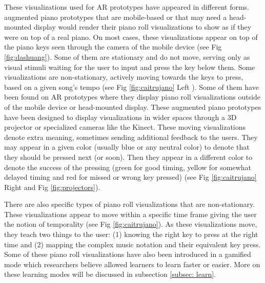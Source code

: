 \documentclass[sigconf, screen, review]{acmart}
\let\xtodo\todo
\renewcommand{\todo}[1]{\xtodo[inline]{#1}}
\newcommand{\todoj}[1]{\xtodo[inline,color=orange!50]{Jordan: #1}}
\begin{document}
These visualizations used for AR prototypes have appeared in different forms. augmented piano prototypes that are mobile-based or that may need a head-mounted display would render their piano roll visualizations to show as if they were on top of a real piano. On most cases, these visualizations appear on top of the piano keys seen through the camera of the mobile device (see Fig \ref{fig:dashuang}). Some of them are stationary and do not move, serving only as visual stimuli waiting for the user to input and press the key below them. Some visualizations are non-stationary, actively moving towards the keys to press, based on a given song's tempo (see Fig \ref{fig:caitrujano} Left ). Some of them have been found on AR prototypes where they display piano roll visualizations outside of the mobile device or head-mounted display. These augmented piano prototypes have been designed to display visualizations in wider spaces through a 3D projector or specialized cameras like the Kinect. These moving visualizations denote extra meaning, sometimes sending additional feedback to the users. They may appear in a given color (usually blue or any neutral color) to denote that they should be pressed next (or soon). Then they appear in a different color to denote the success of the pressing (green for good timing, yellow for somewhat delayed timing and red for missed or wrong key pressed) (see Fig \ref{fig:caitrujano} Right and Fig \ref{fig:projectors}). 

\todoj{sketch caitrujano !! }
There are also specific types of piano roll visualizations that are non-stationary. These visualizations appear to move within a specific time frame giving the user the notion of temporality (see Fig \ref{fig:caitrujano}). As these visualizations move, they teach two things to the user: (1) knowing the right key to press at the right time and (2) mapping the complex music notation and their equivalent key press. Some of these piano roll visualizations have also been introduced in a gamified mode \cite{Weing:2013:PEI:2494091.2494113} which researchers believe allowed learners to learn faster or easier. More on these learning modes will be discussed in subsection \ref{subsec: learn}. 
\end{document}
